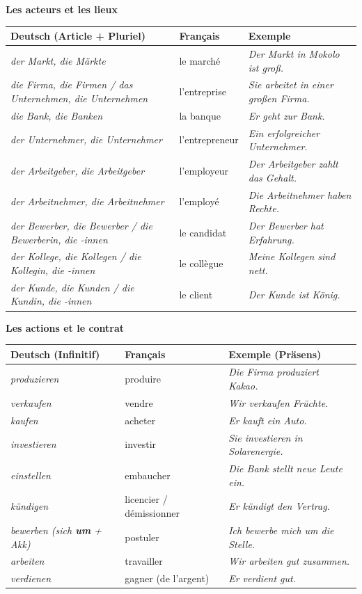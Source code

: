 \documentclass[11pt]{article}
\newcommand{\all}[1]{\ifmmode\text{\textit{#1}}\else\begingroup\selectlanguage{ngerman}\itshape #1\endgroup\fi}
\begin{document}
\begin{aretenir}
\textbf{Les acteurs et les lieux}
\begin{center}
\begin{tabular}{|l|l|l|}
\hline
\rowcolor{popblueL} \textbf{Deutsch (Article + Pluriel)} & \textbf{Français} & \textbf{Exemple} \\
\hline
\all{der Markt, die Märkte} & le marché & \all{Der Markt in Mokolo ist groß.} \\
\all{die Firma, die Firmen / das Unternehmen, die Unternehmen} & l'entreprise & \all{Sie arbeitet in einer großen Firma.} \\
\all{die Bank, die Banken} & la banque & \all{Er geht zur Bank.} \\
\all{der Unternehmer, die Unternehmer} & l'entrepreneur & \all{Ein erfolgreicher Unternehmer.} \\
\all{der Arbeitgeber, die Arbeitgeber} & l'employeur & \all{Der Arbeitgeber zahlt das Gehalt.} \\
\all{der Arbeitnehmer, die Arbeitnehmer} & l'employé & \all{Die Arbeitnehmer haben Rechte.} \\
\all{der Bewerber, die Bewerber / die Bewerberin, die -innen} & le candidat & \all{Der Bewerber hat Erfahrung.} \\
\all{der Kollege, die Kollegen / die Kollegin, die -innen} & le collègue & \all{Meine Kollegen sind nett.} \\
\all{der Kunde, die Kunden / die Kundin, die -innen} & le client & \all{Der Kunde ist König.} \\
\hline
\end{tabular}
\end{center}

\textbf{Les actions et le contrat}
\begin{center}
\begin{tabular}{|l|l|l|}
\hline
\rowcolor{popblueL} \textbf{Deutsch (Infinitif)} & \textbf{Français} & \textbf{Exemple (Präsens)} \\
\hline
\all{produzieren} & produire & \all{Die Firma produziert Kakao.} \\
\all{verkaufen} & vendre & \all{Wir verkaufen Früchte.} \\
\all{kaufen} & acheter & \all{Er kauft ein Auto.} \\
\all{investieren} & investir & \all{Sie investieren in Solarenergie.} \\
\all{einstellen} & embaucher & \all{Die Bank stellt neue Leute ein.} \\
\all{kündigen} & licencier / démissionner & \all{Er kündigt den Vertrag.} \\
\all{bewerben (sich \textbf{um} + Akk)} & postuler & \all{Ich bewerbe mich um die Stelle.} \\
\all{arbeiten} & travailler & \all{Wir arbeiten gut zusammen.} \\
\all{verdienen} & gagner (de l'argent) & \all{Er verdient gut.} \\
\hline
\end{tabular}
\end{center}


\end{aretenir}
\end{document}
